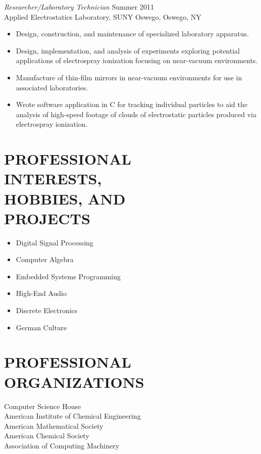 \documentclass[line,margin]{res}
\begin{document}
\begin{resume}
                {\sl Researcher/Laboratory Technician} \hfill Summer 2011 \\
                Applied Electrostatics Laboratory, 
                SUNY Oswego, Oswego, NY
                 \begin{itemize}  \itemsep -2pt %
                \item   Design, construction, and maintenance of 
				        specialized laboratory apparatus.
                \item   Design, implementation, and analysis of
				        experiments exploring potential applications
						of electrospray ionization focusing
						on near-vacuum environments.
				\item   Manufacture of thin-film mirrors in
				        near-vacuum environments for use in
						associated laboratories.
				\item   Wrote software application in C
						for tracking individual particles
						to aid the analysis of high-speed footage
						of clouds of electrostatic particles
						produced via electrospray ionization.
                \end{itemize}

\section{PROFESSIONAL \\ INTERESTS, \\ HOBBIES, AND \\ PROJECTS}
				\begin{itemize} \itemsep -2pt
				\item	Digital Signal Processing
				\item	Computer Algebra
				\item	Embedded Systems Programming
				\item	High-End Audio
				\item	Discrete Electronics
				\item	German Culture
				\end{itemize}

\section{PROFESSIONAL ORGANIZATIONS}             
            	Computer Science House\\
                American Institute of Chemical Engineering\\
				American Mathematical Society\\
				American Chemical Society\\
				Association of Computing Machinery\\


\end{resume}
\end{document}

